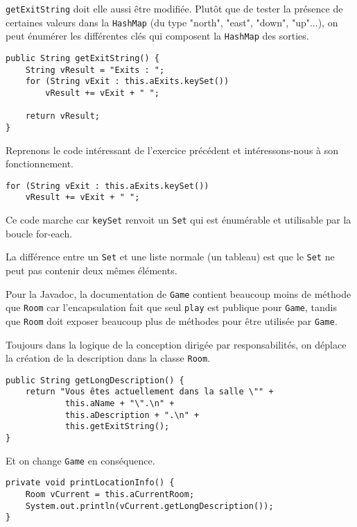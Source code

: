 \begin{exercise}[subtitle=keySet]

\verb|getExitString| doit elle aussi être modifiée. Plutôt que de tester la présence de certaines valeurs dans la \verb|HashMap| (du type "north", "east", "down", "up"...), on peut énumérer les différentes clés qui composent la \verb|HashMap| des sorties.

\begin{verbatim}
public String getExitString() {
    String vResult = "Exits : ";
    for (String vExit : this.aExits.keySet())
        vResult += vExit + " ";

    return vResult;
}
\end{verbatim}
\end{exercise}

\begin{exercise}[subtitle=Fonctionnement de keySet & Javadoc]

Reprenons le code intéressant de l'exercice précédent et intéressons-nous à son fonctionnement.

\begin{verbatim}
for (String vExit : this.aExits.keySet())
    vResult += vExit + " ";
\end{verbatim}

Ce code marche car \verb|keySet| renvoit un \verb|Set| qui est énumérable et utilisable par la boucle for-each.

La différence entre un \verb|Set| et une liste normale (un tableau) est que le \verb|Set| ne peut pas contenir deux mêmes éléments.

Pour la Javadoc, la documentation de \verb|Game| contient beaucoup moins de méthode que \verb|Room| car l'encapsulation fait que seul \verb|play| est publique pour \verb|Game|, tandis que \verb|Room| doit exposer beaucoup plus de méthodes pour être utilisée par \verb|Game|.

\end{exercise}

\begin{exercise}[subtitle=getLongDescription]

Toujours dans la logique de la conception dirigée par responsabilités, on déplace la création de la description dans la classe \verb|Room|.

\begin{verbatim}
public String getLongDescription() {
    return "Vous êtes actuellement dans la salle \"" +
            this.aName + "\".\n" +
            this.aDescription + ".\n" +
            this.getExitString();
}
\end{verbatim}

Et on change \verb|Game| en conséquence.

\begin{verbatim}
private void printLocationInfo() {
    Room vCurrent = this.aCurrentRoom;
    System.out.println(vCurrent.getLongDescription());
}
\end{verbatim}
\end{exercise}

